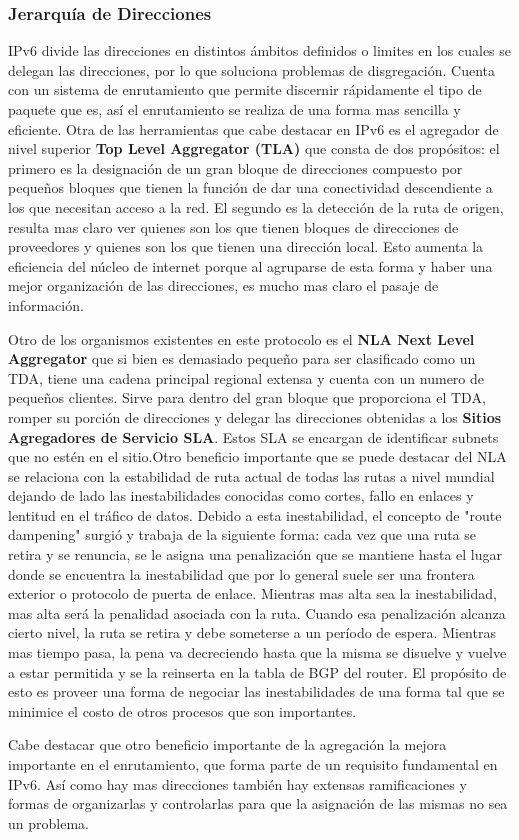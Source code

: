 \documentclass[11pt,a4paper]{article}
\begin{document}
\subsubsection{Jerarquía de Direcciones}
IPv6 divide las direcciones en distintos ámbitos definidos o limites en los cuales se delegan las 
direcciones, por lo que soluciona problemas de disgregación. Cuenta con un sistema de enrutamiento 
que permite discernir rápidamente el tipo de paquete que es, así el enrutamiento se realiza de una 
forma mas sencilla y eficiente.
Otra de las herramientas que cabe destacar en IPv6 es el agregador de nivel superior \textbf{Top 
Level Aggregator (TLA)} que consta de dos propósitos: el primero es la designación de un gran bloque 
de direcciones compuesto por pequeños bloques que tienen la función de dar una conectividad 
descendiente a los que necesitan acceso a la red. El segundo es la detección de la ruta de origen, 
resulta mas claro ver quienes son los que tienen bloques de direcciones de proveedores y quienes son 
los que tienen una dirección local. Esto aumenta la eficiencia del núcleo de internet porque al 
agruparse de esta forma y haber una mejor organización de las direcciones, es mucho mas claro el 
pasaje de información.\par
Otro de los organismos existentes en este protocolo es el \textbf{NLA Next Level Aggregator} que si 
bien es demasiado pequeño para ser clasificado como un TDA, tiene una cadena principal regional 
extensa y cuenta con un numero de pequeños clientes. Sirve para dentro del gran bloque que 
proporciona el TDA, romper su porción de direcciones y delegar las direcciones obtenidas a los 
\textbf{Sitios Agregadores de Servicio SLA}. Estos SLA se encargan de identificar subnets que no 
estén en el sitio.Otro beneficio importante que se puede destacar del NLA se relaciona con la 
estabilidad de ruta actual de todas las rutas a nivel mundial dejando de lado las inestabilidades 
conocidas como cortes, fallo en enlaces y lentitud en el tráfico de datos. Debido a esta 
inestabilidad, el concepto de "route dampening" surgió y trabaja de la siguiente forma: cada vez que 
una ruta se retira y se renuncia, se le asigna una penalización que se mantiene hasta el lugar donde 
se encuentra la inestabilidad que por lo general suele ser una frontera exterior o  protocolo de 
puerta de enlace. Mientras mas alta sea la inestabilidad, mas alta será la penalidad asociada con la 
ruta. Cuando esa penalización alcanza cierto nivel, la ruta se retira y debe someterse a un período 
de espera. Mientras mas tiempo pasa, la pena va decreciendo hasta que la misma se disuelve y vuelve 
a estar permitida y se la reinserta en la tabla  de BGP del router. El propósito de esto es proveer 
una forma de negociar las inestabilidades de una forma tal que se minimice el costo de otros 
procesos que son importantes.\par
Cabe destacar que otro beneficio importante de la agregación la mejora importante en el 
enrutamiento, que forma parte de un requisito fundamental en IPv6. Así como hay mas direcciones 
también hay extensas ramificaciones y formas de organizarlas y controlarlas para que la asignación 
de las mismas  no sea un problema.
\end{document}
